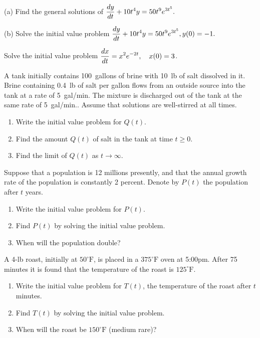 

\item
(a) Find the general solutions of 
$\displaystyle {dy\over dt}+10t^4 y= 50 t^9 e^{3t^5}.$ 

(b) Solve the initial value problem $\displaystyle
{dy\over dt}+10t^4 y= 50 t^9 e^{3t^5}, y(0)=-1.
$ 

\item
Solve the initial value problem
$\displaystyle {dx\over dt}= x^2 e^{-2t},  \quad x(0)=3$.

\item
A tank initially contains 100~gallons of brine with 10~lb
of salt dissolved in it. 
Brine containing 0.4~lb of salt per gallon flows from an outside source into the tank at a rate of 5~gal/min. 
The mixture is discharged out of the tank at the same rate of 5~gal/min.. 
Assume that solutions are well-stirred at all times. 
	\begin{enumerate}
	\item
Write the initial value problem for $Q(t)$.
	\item
Find the amount $Q(t)$ of salt in the tank at time $t\ge 0$.
	\item
Find the limit of $Q(t)$ as $t\to\infty$.
	\end{enumerate} 


\item 
Suppose that a population is 12 millions presently, 
and that the annual growth rate of the population is constantly 2 percent.
Denote by $P(t)$ the population after $t$ years.
	\begin{enumerate}
	\item
Write the initial value problem for $P(t)$.
	\item
Find $P(t)$ by solving the initial value problem.
	\item
When will the population double?
	\end{enumerate}


\item
A 4-lb roast, initially at $50^{\circ}\mbox{F}$, is placed in a $375^{\circ}\mbox{F}$ oven at 5:00pm.
After 75 minutes it is found that the temperature of the roast is $125^{\circ}\mbox{F}$.
	\begin{enumerate}
	\item
Write the initial value problem for $T(t)$, the temperature of the roast after $t$ minutes.
	\item
Find $T(t)$ by solving the initial value problem.
	\item
When will the roast be $150^{\circ}\mbox{F}$ (medium rare)?
	\end{enumerate}



